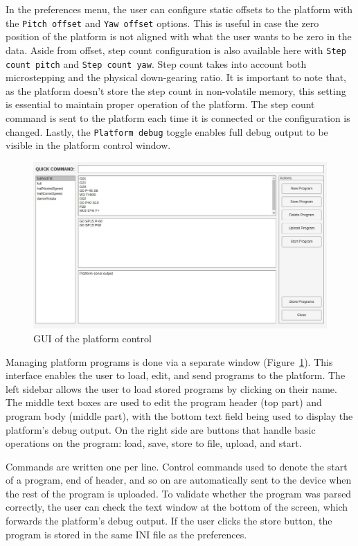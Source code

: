In the preferences menu, the user can configure static offsets to the platform with the \texttt{Pitch offset} and \texttt{Yaw offset} options.
This is useful in case the zero position of the platform is not aligned with what the user wants to be zero in the data.
Aside from offset, step count configuration is also available here with \texttt{Step count pitch} and \texttt{Step count yaw}.
Step count takes into account both microstepping and the physical down-gearing ratio.
It is important to note that, as the platform doesn't store the step count in non-volatile memory, this setting is essential to maintain proper operation of the platform.
The step count command is sent to the platform each time it is connected or the configuration is changed.
Lastly, the \texttt{Platform debug} toggle enables full debug output to be visible in the platform control window.

\begin{figure}[h!]
  \centering
  \includegraphics[width=\textwidth]{../img/platform_control.jpg}
  \caption[GUI of the platform control]{GUI of the platform control}
  \label{fig:platformControl}
\end{figure}

Managing platform programs is done via a separate window (Figure~\ref{fig:platformControl}).
This interface enables the user to load, edit, and send programs to the platform.
The left sidebar allows the user to load stored programs by clicking on their name.
The middle text boxes are used to edit the program header (top part) and program body (middle part), with the bottom text field being used to display the platform's debug output.
On the right side are buttons that handle basic operations on the program: load, save, store to file, upload, and start.

Commands are written one per line.
Control commands used to denote the start of a program, end of header, and so on are automatically sent to the device when the rest of the program is uploaded.
To validate whether the program was parsed correctly, the user can check the text window at the bottom of the screen, which forwards the platform's debug output.
If the user clicks the store button, the program is stored in the same INI file as the preferences.


